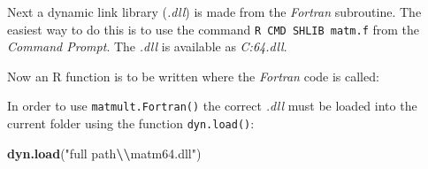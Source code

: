 \documentclass[
]{book}
\newenvironment{Shaded}{\begin{snugshade}}{\end{snugshade}}
\newcommand{\AttributeTok}[1]{\textcolor[rgb]{0.13,0.29,0.53}{#1}}
\newcommand{\ControlFlowTok}[1]{\textcolor[rgb]{0.13,0.29,0.53}{\textbf{#1}}}
\newcommand{\DecValTok}[1]{\textcolor[rgb]{0.00,0.00,0.81}{#1}}
\newcommand{\FunctionTok}[1]{\textcolor[rgb]{0.13,0.29,0.53}{\textbf{#1}}}
\newcommand{\NormalTok}[1]{#1}
\newcommand{\OtherTok}[1]{\textcolor[rgb]{0.56,0.35,0.01}{#1}}
\newcommand{\SpecialCharTok}[1]{\textcolor[rgb]{0.81,0.36,0.00}{\textbf{#1}}}
\newcommand{\StringTok}[1]{\textcolor[rgb]{0.31,0.60,0.02}{#1}}
\begin{document}
Next a dynamic link library (\emph{{.dll}}) is made from the \emph{{Fortran}} subroutine. The easiest way to do this is to use the command \texttt{R\ CMD\ SHLIB\ matm.f} from the \emph{{Command Prompt}}. The \emph{{.dll}} is available as \emph{{C:\matm64.dll}}.

Now an R function is to be written where the \emph{{Fortran}} code is called:

\begin{Shaded}
\end{Shaded}

In order to use \texttt{matmult.Fortran()} the correct \emph{{.dll}} must be loaded into the current folder using the function \texttt{dyn.load()}:

\begin{Shaded}
\begin{Highlighting}[]
\FunctionTok{dyn.load}\NormalTok{(}\StringTok{"full path}\SpecialCharTok{\textbackslash{}\textbackslash{}}\StringTok{matm64.dll"}\NormalTok{)}
\end{Highlighting}
\end{Shaded}
\end{document}
